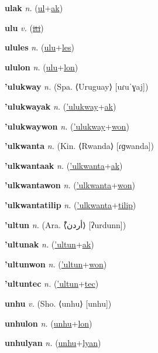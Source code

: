 \textbf{\hypertarget{ulak}{ulak}} \textit{n.} (\hyperlink{ul}{ul}+\allowbreak \hyperlink{ak}{ak})


\textbf{\hypertarget{ulu}{ulu}} \textit{v.} (\hyperlink{iti}{\sout{iti}})


\textbf{\hypertarget{ulules}{ulules}} \textit{n.} (\hyperlink{ulu}{ulu}+\allowbreak \hyperlink{les}{les})


\textbf{\hypertarget{ululon}{ululon}} \textit{n.} (\hyperlink{ulu}{ulu}+\allowbreak \hyperlink{lon}{lon})


\textbf{\hypertarget{'ulukway}{'ulukway}} \textit{n.} (Spa. ⟨Uruguay⟩ [uɾuˈɣaj])


\textbf{\hypertarget{'ulukwayak}{'ulukwayak}} \textit{n.} (\hyperlink{'ulukway}{'ulukway}+\allowbreak \hyperlink{ak}{ak})


\textbf{\hypertarget{'ulukwaywon}{'ulukwaywon}} \textit{n.} (\hyperlink{'ulukway}{'ulukway}+\allowbreak \hyperlink{won}{won})


\textbf{\hypertarget{'ulkwanta}{'ulkwanta}} \textit{n.} (Kin. ⟨Rwanda⟩ [ɾɡwanda])


\textbf{\hypertarget{'ulkwantaak}{'ulkwantaak}} \textit{n.} (\hyperlink{'ulkwanta}{'ulkwanta}+\allowbreak \hyperlink{ak}{ak})


\textbf{\hypertarget{'ulkwantawon}{'ulkwantawon}} \textit{n.} (\hyperlink{'ulkwanta}{'ulkwanta}+\allowbreak \hyperlink{won}{won})


\textbf{\hypertarget{'ulkwantatilip}{'ulkwantatilip}} \textit{n.} (\hyperlink{'ulkwanta}{'ulkwanta}+\allowbreak \hyperlink{tilip}{tilip})


\textbf{\hypertarget{'ultun}{'ultun}} \textit{n.} (Ara. ⟨{\arabics{}ْأردن}⟩ [ʔurdunn])


\textbf{\hypertarget{'ultunak}{'ultunak}} \textit{n.} (\hyperlink{'ultun}{'ultun}+\allowbreak \hyperlink{ak}{ak})


\textbf{\hypertarget{'ultunwon}{'ultunwon}} \textit{n.} (\hyperlink{'ultun}{'ultun}+\allowbreak \hyperlink{won}{won})


\textbf{\hypertarget{'ultuntec}{'ultuntec}} \textit{n.} (\hyperlink{'ultun}{'ultun}+\allowbreak \hyperlink{tec}{tec})


\textbf{\hypertarget{unhu}{unhu}} \textit{v.} (Sho. ⟨unhu⟩ [unhu])


\textbf{\hypertarget{unhulon}{unhulon}} \textit{n.} (\hyperlink{unhu}{unhu}+\allowbreak \hyperlink{lon}{lon})


\textbf{\hypertarget{unhulyan}{unhulyan}} \textit{n.} (\hyperlink{unhu}{unhu}+\allowbreak \hyperlink{lyan}{lyan})


